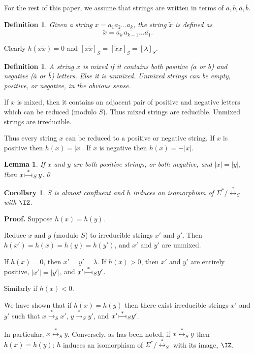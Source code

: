 \documentclass[12pt,a4paper]{article}
\newtheorem{definition}[theorem]{Definition}
\newtheorem{lemma}[theorem]{Lemma}
\newtheorem{corollary}[theorem]{Corollary}
\newcommand{\redstar}{{\overset{*}{\rightarrow}}}
\newcommand{\thuecong}{{\overset{*}{\leftrightarrow}}}
\newcommand{\pres}{\,
{\vrule height5pt width.5pt depth0pt
\overset{\vrule height.5pt width10pt depth0pt}
{\vrule height0pt width0pt depth0pt}
\vrule height5pt width.5pt depth0pt}\,}
\newcommand{\presstar}{{\overset{*}{\pres}}}
\numberwithin{equation}{section}
\newcommand{\be}{\begin{equation*}}
\newcommand{\ee}{\end{equation*}}
\begin{document}
For the rest of this paper, we assume that strings
are written in terms of $a,b,\overline{a}, \overline{b}$.

\begin{definition}
Given a string $x = a_1 a_2 \ldots a_k$, the string
$\tilde{x}$ is defined as
\be
\tilde{x} = \overline{a_k} \, \overline{a_{k-1}} \ldots \overline{a_1}.
\ee
\end{definition}
Clearly $h(x\tilde{x}) = 0$ and
$[x \tilde{x}]_S = [\tilde{x}x]_S = [\lambda]_S$.

\begin{definition}
A string $x$ is {\em mixed} if it contains both positive
($a$ or $b$) and negative ($\overline{a}$ or $\overline{b}$) letters.
Else it is {\em unmixed}.  Unmixed strings can be
empty, positive, or negative, in the obvious sense.
\end{definition}

If $x$ is mixed, then it contains an adjacent pair of
positive and negative letters which can be reduced
(modulo $S$).  Thus mixed strings are reducible.
Unmixed strings are irreducible.

Thus every string $x$ can be reduced to a positive
or negative string.
If $x$ is positive then $h(x) = |x|$.  If $x$
is negative then $h(x) = -|x|$.

\begin{lemma}
If $x$ and $y$ are both positive strings,
or both negative, and $|x| = |y|$, then
$x{\presstar}_S\, y$.\qed
\end{lemma}

\begin{corollary}
$S$ is almost confluent and $h$ induces an
isomorphism of $\Sigma^*/{\thuecong}_S$ with $\IZ$.
\end{corollary}

{\bf Proof.}
Suppose $h(x) = h(y)$.

Reduce $x$ and $y$ (modulo $S$) to irreducible
strings $x'$ and $y'$.  Then $h(x') = h(x) = h(y) = h(y')$,
and $x'$ and $y'$ are unmixed.

If $h(x) = 0$, then $x'=y'=\lambda$.
If $h(x) > 0$, then $x'$ and $y'$ are entirely positive,
$|x'| = |y'|$, and $x' {\presstar}_S y'$.

Similarly if $h(x) < 0$.

We have shown that if $h(x) = h(y)$ then there exist irreducible
strings $x'$ and $y'$ such that $x {\redstar}_S x'$,
$y {\redstar}_S y'$, and $x' {\presstar}_S y'$.

In particular, $x {\thuecong}_S y$.
Conversely, as has been noted, if $x {\thuecong}_S y$ then
$h(x) = h(y)$:
$h$ induces
an isomorphism of $\Sigma^*/{\thuecong}_S$ with its image, $\IZ$.
\end{document}
